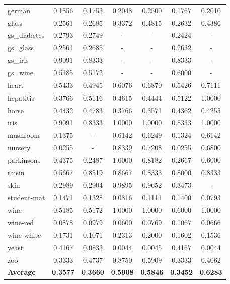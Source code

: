 \documentclass[11pt,a4paper]{article}
\begin{document}
\begin{longtable}{lcccccc}
german & 0.1856 & 0.1753 & 0.2048 & 0.2500 & 0.1767 & 0.2010 \\
glass & 0.2561 & 0.2685 & 0.3372 & 0.4815 & 0.2632 & 0.4386 \\
gs\_diabetes & 0.2793 & 0.2749 & - & - & 0.2424 & - \\
gs\_glass & 0.2561 & 0.2685 & - & - & 0.2632 & - \\
gs\_iris & 0.9091 & 0.8333 & - & - & 0.8333 & - \\
gs\_wine & 0.5185 & 0.5172 & - & - & 0.6000 & - \\
heart & 0.5433 & 0.4945 & 0.6076 & 0.6870 & 0.5426 & 0.7111 \\
hepatitis & 0.3766 & 0.5116 & 0.4615 & 0.4444 & 0.5122 & 1.0000 \\
horse & 0.4432 & 0.4783 & 0.3766 & 0.3571 & 0.4362 & 0.4255 \\
iris & 0.9091 & 0.8333 & 1.0000 & 1.0000 & 0.8333 & 1.0000 \\
mushroom & 0.1375 & - & 0.6142 & 0.6249 & 0.1324 & 0.6142 \\
nursery & 0.0255 & - & 0.8339 & 0.7208 & 0.0255 & 0.6800 \\
parkinsons & 0.4375 & 0.2487 & 1.0000 & 0.8182 & 0.2667 & 0.6000 \\
raisin & 0.5667 & 0.8519 & 0.8667 & 0.8333 & 0.8000 & 0.8333 \\
skin & 0.2989 & 0.2904 & 0.9895 & 0.9652 & 0.3473 & - \\
student-mat & 0.1471 & 0.1328 & 0.0816 & 0.1111 & 0.1400 & 0.0793 \\
wine & 0.5185 & 0.5172 & 1.0000 & 1.0000 & 0.6000 & 1.0000 \\
wine-red & 0.0878 & 0.0979 & 0.0600 & 0.0769 & 0.1067 & 0.0666 \\
wine-white & 0.1731 & 0.1071 & 0.2313 & 0.2000 & 0.1602 & 0.1536 \\
yeast & 0.4167 & 0.0833 & 0.0044 & 0.0045 & 0.4167 & 0.0044 \\
zoo & 0.3333 & 0.4737 & 0.8750 & 0.5909 & 0.3333 & 0.4062 \\
\midrule \textbf{Average} & \textbf{0.3577} & \textbf{0.3660} & \textbf{0.5908} & \textbf{0.5846} & \textbf{0.3452} & \textbf{0.6283} \\
\bottomrule\end{longtable}
\end{document}
